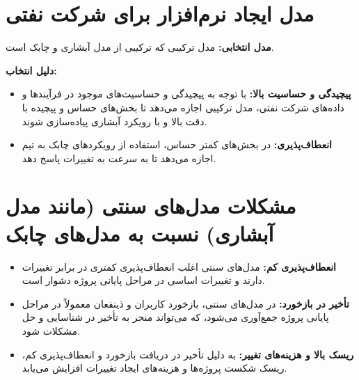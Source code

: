 \section*{ مدل ایجاد نرم‌افزار برای شرکت نفتی}
\textbf{مدل انتخابی:}
مدل ترکیبی
که ترکیبی از مدل آبشاری و چابک است.

\textbf{دلیل انتخاب:}

\begin{itemize}
	\item \textbf{پیچیدگی و حساسیت بالا:}
	 با توجه به پیچیدگی و حساسیت‌های موجود در فرآیندها و داده‌های شرکت نفتی، مدل ترکیبی اجازه می‌دهد تا بخش‌های حساس و پیچیده با دقت بالا و با رویکرد آبشاری پیاده‌سازی شوند.
	\item \textbf{انعطاف‌پذیری:}
	در بخش‌های کمتر حساس، استفاده از رویکردهای چابک به تیم اجازه می‌دهد تا به سرعت به تغییرات پاسخ دهد.
\end{itemize}

\section*{ مشکلات مدل‌های سنتی (مانند مدل آبشاری) نسبت به مدل‌های چابک}
\begin{itemize}
	\item \textbf{انعطاف‌پذیری کم:}
	مدل‌های سنتی اغلب انعطاف‌پذیری کمتری در برابر تغییرات دارند و تغییرات اساسی در مراحل پایانی پروژه دشوار است.
	\item \textbf{تأخیر در بازخورد:}
	در مدل‌های سنتی، بازخورد کاربران و ذینفعان معمولاً در مراحل پایانی پروژه جمع‌آوری می‌شود، که می‌تواند منجر به تأخیر در شناسایی و حل مشکلات شود.
	\item \textbf{ریسک بالا و هزینه‌های تغییر:}
	به دلیل تأخیر در دریافت بازخورد و انعطاف‌پذیری کم، ریسک شکست پروژه‌ها و هزینه‌های ایجاد تغییرات افزایش می‌یابد.
\end{itemize}